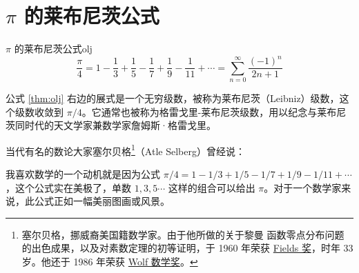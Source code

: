 \documentclass[12pt, cn]{elegantart}
\begin{document}
\begin{center}
\end{center}


\section{$\pi$ 的莱布尼茨公式}

\begin{theorem}{$\pi$ 的莱布尼茨公式}{olj}
	\begin{equation}
	\frac{\pi}{4}=1-\frac{1}{3}+\frac{1}{5}-\frac{1}{7}+\frac{1}{9}-\frac{1}{11}+\cdots =\sum_{n=0}^{\infty} \frac{(-1)^{n}}{2 n+1}
	\end{equation}
   \vspace{-12pt}
\end{theorem}

公式 \eqref{thm:olj} 右边的展式是一个无穷级数，被称为莱布尼茨（Leibniz）级数，这个级数收敛到 $\pi/4$。它通常也被称为格雷戈里-莱布尼茨级数，用以纪念与莱布尼茨同时代的天文学家兼数学家詹姆斯·格雷戈里。

当代有名的数论大家塞尔贝格\footnote{塞尔贝格，挪威裔美国籍数学家。由于他所做的关于黎曼 \textzeta 函数零点分布问题的出色成果，以及对素数定理的初等证明，于 1960 年荣获 \href{https://www.mathunion.org/imu-awards/fields-medal}{Fields 奖}，时年 33 岁。他还于 1986 年荣获 \href{[Wolf 数学奖](http://www.wolffund.org.il/index.php?dir=site&page=winners&cs=221}{Wolf 数学奖}。}（Atle Selberg）曾经说：
\vspace{8pt}

\begin{tcolorbox}[saying]
	我喜欢数学的一个动机就是因为公式 $\pi/4=1-1/3+1/5-1/7+1/9-1/11+\cdots$，这个公式实在美极了，单数 $1,3,5\cdots$ 这样的组合可以给出 $\pi$。对于一个数学家来说，此公式正如一幅美丽图画或风景。
\end{tcolorbox}
\end{document}
